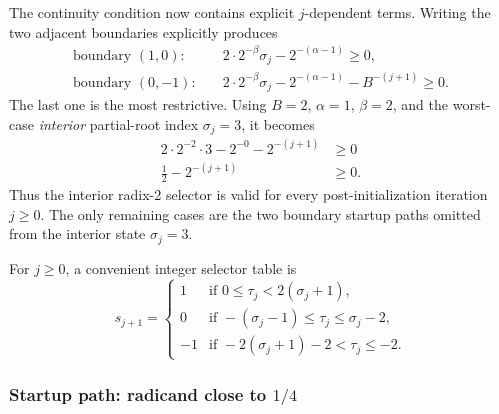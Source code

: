 \documentclass[11pt]{article}
\numberwithin{equation}{section}
\begin{document}
The continuity condition now contains explicit $j$-dependent terms.
Writing the two adjacent boundaries explicitly produces
\begin{align}
  \text{boundary }(1,0):
  &\quad
  2\cdot 2^{-\beta}\sigma_j - 2^{-(\alpha-1)} \ge 0,
  \label{eq:sqrt:radix2_cont_10} \\
  \text{boundary }(0,-1):
  &\quad
  2\cdot 2^{-\beta}\sigma_j - 2^{-(\alpha-1)} - B^{-(j+1)} \ge 0.
  \label{eq:sqrt:radix2_cont_0m1}
\end{align}
The last one is the most restrictive.
Using $B=2$, $\alpha=1$, $\beta=2$, and the worst-case \emph{interior} partial-root index
$\sigma_j=3$, it becomes
\begin{align}
  2\cdot 2^{-2}\cdot 3 - 2^{-0} - 2^{-(j+1)} &\ge 0 \nonumber \\
  \frac{1}{2} - 2^{-(j+1)} &\ge 0.
  \label{eq:sqrt:radix2_startup_restriction}
\end{align}
Thus the interior radix-2 selector is valid for every post-initialization iteration $j\ge 0$.
The only remaining cases are the two boundary startup paths omitted from the interior state
$\sigma_j=3$.

For $j\ge 0$, a convenient integer selector table is
\begin{equation}
  \label{eq:sqrt:radix2_logic}
  s_{j+1} =
  \begin{cases}
    1  & \text{if } 0 \le \tau_j < 2(\sigma_j+1), \\
    0  & \text{if } -(\sigma_j-1) \le \tau_j \le \sigma_j - 2, \\
    -1 & \text{if } -2(\sigma_j+1) - 2 < \tau_j \le -2.
  \end{cases}
\end{equation}

\subsubsection{Startup path: radicand close to \texorpdfstring{$1/4$}{1/4}}
\label{sssec:sqrt:radix2_near_quarter}
\end{document}

